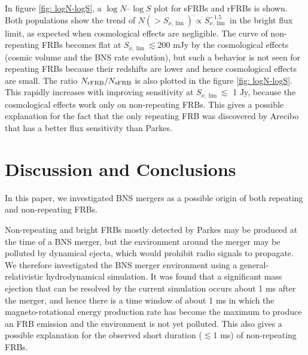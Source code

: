 \documentclass[]{pasj01}
\begin{document}
In figure \ref{fig: logN-logS}, a $\log{N}$--$\log{S}$ plot for sFRBs
and rFRBs is shown. Both populations show the trend of $N(> S_{\nu,
  \lim}) \propto S_{\nu, \lim}^{-1.5}$ in the bright flux limit, as
expected when cosmological effects are negligible.  The curve of
non-repeating FRBs becomes flat at $S_{\nu, \lim} \lesssim 200$ mJy by
the cosmological effects (cosmic volume and the BNS rate evolution),
but such a behavior is not seen for repeating FRBs because their
redshifts are lower and hence cosmological effects are small.  The
ratio $N_{\rm rFRB}/N_{\rm sFRB}$ is also plotted in the figure \ref{fig: logN-logS}.  This rapidly increases with improving
sensitivity at $S_{\nu, \lim} \lesssim$ 1 Jy, because the cosmological
effects work only on non-repeating FRBs. This gives a possible
explanation for the fact that the only repeating FRB was discovered by
Arecibo that has a better flux sensitivity than Parkes.
 

\section{Discussion and Conclusions}
\label{sec: Conclusions}
In this paper, we investigated BNS mergers as a possible
origin of both repeating and non-repeating FRBs. 

Non-repeating and bright FRBs mostly detected by Parkes may be
produced at the time of a BNS merger, but the environment around the
merger may be polluted by dynamical ejecta, which would prohibit radio
signals to propagate.  We therefore investigated the BNS merger
environment using a general-relativistic hydrodynamical simulation. It
was found that a significant mass ejection that can be resolved by the
current simulation occurs about 1 ms after the merger, and hence there
is a time window of about 1 ms in which the magneto-rotational energy
production rate has become the maximum to produce an FRB emission and
the environment is not yet polluted.  This also gives a possible
explanation for the observed short duration ($\lesssim$1 ms) of
non-repeating FRBs.
\end{document}
